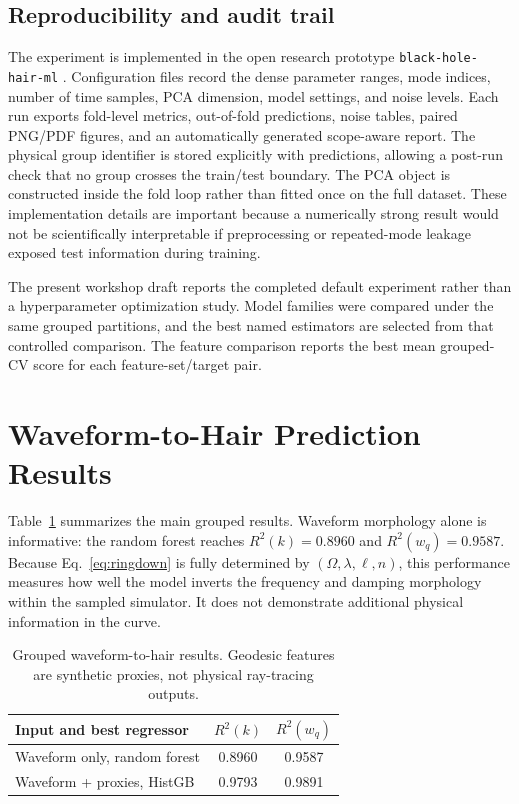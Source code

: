 \documentclass[conference]{IEEEtran}
\newcommand{\wq}{w_q}
\begin{document}
\subsection{Reproducibility and audit trail}
The experiment is implemented in the open research prototype
\texttt{black-hole-hair-ml} \cite{palomino2026bhhairml}. Configuration files
record the dense parameter ranges, mode indices, number of time samples, PCA
dimension, model settings, and noise levels. Each run exports fold-level
metrics, out-of-fold predictions, noise tables, paired PNG/PDF figures, and an
automatically generated scope-aware report. The physical group identifier is
stored explicitly with predictions, allowing a post-run check that no group
crosses the train/test boundary. The PCA object is constructed inside the fold
loop rather than fitted once on the full dataset. These implementation details
are important because a numerically strong result would not be scientifically
interpretable if preprocessing or repeated-mode leakage exposed test
information during training.

The present workshop draft reports the completed default experiment rather than
a hyperparameter optimization study. Model families were compared under the
same grouped partitions, and the best named estimators are selected from that
controlled comparison. The feature comparison reports the best mean grouped-CV
score for each feature-set/target pair.

\section{Waveform-to-Hair Prediction Results}
Table~\ref{tab:main} summarizes the main grouped results. Waveform morphology
alone is informative: the random forest reaches $R^2(k)=0.8960$ and
$R^2(\wq)=0.9587$. Because Eq.~\eqref{eq:ringdown} is fully determined by
$(\Omega,\lambda,\ell,n)$, this performance measures how well the model inverts
the frequency and damping morphology within the sampled simulator. It does not
demonstrate additional physical information in the curve.

\begin{table}[t]
\caption{Grouped waveform-to-hair results. Geodesic features are synthetic
proxies, not physical ray-tracing outputs.}
\label{tab:main}
\centering
\begin{tabular}{lcc}
\toprule
Input and best regressor & $R^2(k)$ & $R^2(\wq)$\\
\midrule
Waveform only, random forest & 0.8960 & 0.9587\\
Waveform + proxies, HistGB & 0.9793 & 0.9891\\
\bottomrule
\end{tabular}
\end{table}
\end{document}

